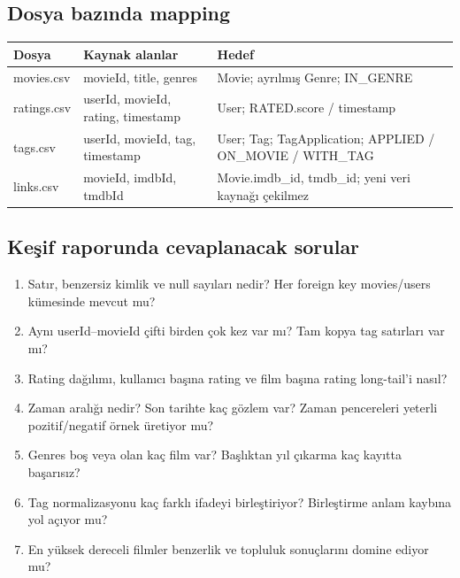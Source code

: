 \documentclass[11pt,a4paper]{article}
\newcommand{\code}[1]{\texttt{\detokenize{#1}}}
\begin{document}
\subsection{Dosya bazında mapping}
\begin{tabularx}{\linewidth}{@{}P{24mm}YY@{}}\toprule
\textbf{Dosya} & \textbf{Kaynak alanlar} & \textbf{Hedef}\\\midrule
movies.csv & movieId, title, genres & Movie; ayrılmış Genre; IN\_GENRE\\
ratings.csv & userId, movieId, rating, timestamp & User; RATED.score / timestamp\\
tags.csv & userId, movieId, tag, timestamp & User; Tag; TagApplication; APPLIED / ON\_MOVIE / WITH\_TAG\\
links.csv & movieId, imdbId, tmdbId & Movie.imdb\_id, tmdb\_id; yeni veri kaynağı çekilmez\\\bottomrule
\end{tabularx}

\subsection{Keşif raporunda cevaplanacak sorular}
\begin{enumerate}
\item Satır, benzersiz kimlik ve null sayıları nedir? Her foreign key movies/users kümesinde mevcut mu?
\item Aynı userId--movieId çifti birden çok kez var mı? Tam kopya tag satırları var mı?
\item Rating dağılımı, kullanıcı başına rating ve film başına rating long-tail'i nasıl?
\item Zaman aralığı nedir? Son tarihte kaç gözlem var? Zaman pencereleri yeterli pozitif/negatif örnek üretiyor mu?
\item Genres boş veya \code{(no genres listed)} olan kaç film var? Başlıktan yıl çıkarma kaç kayıtta başarısız?
\item Tag normalizasyonu kaç farklı ifadeyi birleştiriyor? Birleştirme anlam kaybına yol açıyor mu?
\item En yüksek dereceli filmler benzerlik ve topluluk sonuçlarını domine ediyor mu?
\end{enumerate}
\end{document}
